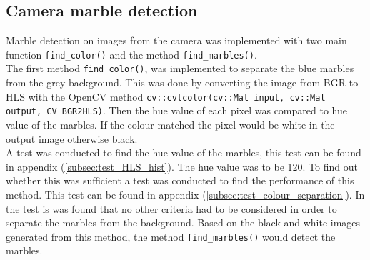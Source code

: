 \documentclass[../Head/Main.tex]{subfiles}
\begin{document}
\subsection{Camera marble detection}
Marble detection on images from the camera was implemented with two main function \texttt{find\_color()} and the method \texttt{find\_marbles()}.\\
The first method \texttt{find\_color()}, was implemented to separate the blue marbles from the grey background. This was done by converting the image from BGR to HLS with the OpenCV method \texttt{cv::cvtcolor(cv::Mat input, cv::Mat output, CV\_BGR2HLS)}. Then the hue value of each pixel was compared to hue value of the marbles. If the colour matched the pixel would be white in the output image otherwise black.\\
A test was conducted to find the hue value of the marbles, this test can be found in appendix (\ref{subsec:test_HLS_hist}). The hue value was to be 120. To find out whether this was sufficient a test was conducted to find the performance of this method. This test can be found in appendix (\ref{subsec:test_colour_separation}). In the test is was found that no other criteria had to be considered in order to separate the marbles from the background. Based on the black and white images generated from this method, the method \texttt{find\_marbles()} would detect the marbles.\par 
\end{document}
